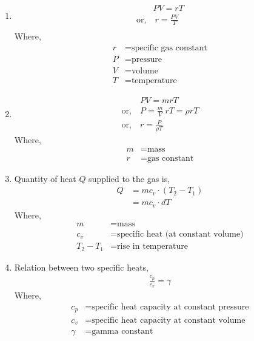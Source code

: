 \documentclass[12pt]{article}
\begin{document}
\begin{enumerate}[label=\roman*.]
	\item
		\[
		\begin{aligned}
			& PV = rT \\
			 \text{or,} & \ r = \frac{PV}{T} \\
		\end{aligned}
		\]
		Where,
		\begin{align*}
			r &= \text{specific gas constant} \\
			P &= \text{pressure} \\
			V &= \text{volume} \\
			T &= \text{temperature}
		\end{align*}

	\item
		\[
		\begin{aligned}
			& PV = mrT \\
			\text{or,} \ & P = \frac{m}{V} \ rT = \rho rT \\
			\text{or,} \ & r = \frac{P}{\rho T}
		\end{aligned}
		\]
		Where,
		\begin{align*}
			m &= \text{mass} \\
			r &= \text{gas constant}
		\end{align*}

	\item Quantity of heat $Q$ supplied to the gas is,
		\begin{align*}
			Q &= m c_{v} \cdot (T_{2} - T_{1})\\
			  &= m c_{v} \cdot dT
		\end{align*}
		Where,
		\begin{align*}
			m &= \text{mass} \\
			c_{v} &= \text{specific heat (at constant volume)} \\
			T_{2} - T_{1} &= \text{rise in temperature}
		\end{align*}

	\item Relation between two specific heats,
		\[
		\begin{aligned}
			\frac{c_p}{c_v} = \gamma
		\end{aligned}
		\]
		Where,
		\begin{align*}
			c_p &= \text{specific heat capacity at constant pressure} \\
			c_v &= \text{specific heat capacity at constant volume} \\
			\gamma &= \text{gamma constant}
		\end{align*}


\end{enumerate}
\end{document}
